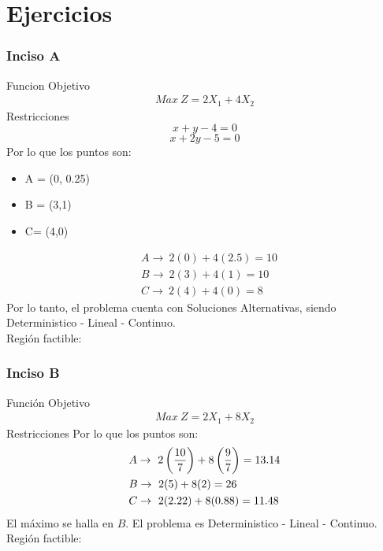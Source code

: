 \documentclass{tarea}
\begin{document}
\caratula
\tableofcontents
\pagebreak


\section{Ejercicios}

\begin{homeworkProblem}
\subsubsection{Inciso A}
Funcion Objetivo 
\begin{align*}
Max\ Z = 2X_1 + 4X_2
\end{align*}
Restricciones 
\begin{equation}\label{1a1}
		x+y-4=0
\end{equation}
\begin{equation}\label{1a2}
		x + 2y -5 =0
\end{equation}
Por lo que los puntos son:
\begin{itemize}
\item A = (0, 0.25)
\item B = (3,1)
\item C= (4,0)
\end{itemize}
\begin{align*}
&A \rightarrow\ 2(0) + 4(2.5) = 10 \\
&B \rightarrow\ 2(3) + 4(1)   = 10 \\
&C \rightarrow\ 2(4) + 4(0)   =  8
\end{align*}
Por lo tanto, el problema cuenta con Soluciones Alternativas, siendo Deterministico - Lineal - Continuo. \\
Región factible:


\subsubsection{Inciso B}
Función Objetivo 
\begin{align*}
Max\ Z = 2X_1 + 8X_2
\end{align*}
Restricciones
Por lo que los puntos son:
\begin{align*}
&A \rightarrow\ 2\left( \frac{10}{7} \right) + 8\left( \frac{9}{7} \right) =13.14 \\
&B \rightarrow\ 2(5) + 8(2)   = 26 \\
&C \rightarrow\ 2(2.22) + 8(0.88)   =  11.48
\end{align*}
El máximo se halla en $B$. El problema es Deterministico - Lineal - Continuo. \\
Región factible:



\end{homeworkProblem}
\end{document}
